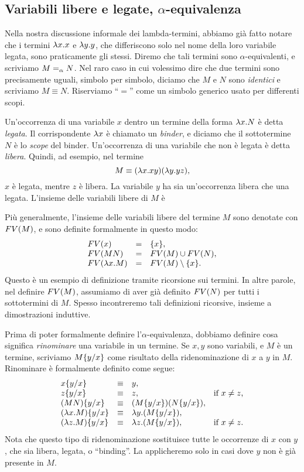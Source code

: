 \documentclass{article}
\begin{document}
\subsection{Variabili libere e legate, $\alpha$-equivalenza}

Nella nostra discussione informale dei lambda-termini, abbiamo gi\`a fatto
notare che i termini $\lambda x.x$ e $\lambda y.y$, che differiscono solo nel
nome della loro variabile legata, sono praticamente gli stessi. Diremo che
tali termini sono $\alpha$-equivalenti, e scriviamo $M=_{\alpha} N$. Nel raro
caso in cui volessimo dire che due termini sono precisamente uguali, simbolo
per simbolo, diciamo che $M$ e $N$ sono {\em identici} e scriviamo $M\equiv N$.
Riserviamo ``$=$'' come un simbolo generico usato per differenti scopi.

Un'occorrenza di una variabile $x$ dentro un termine della forma $\lambda x.N$
\`e detta {\em legata}. Il corrispondente $\lambda x$ \`e chiamato un {\em binder}, e
diciamo che il sottotermine $N$ \`e lo {\em scope} del binder. Un'occorrenza di
una variabile che non \`e legata \`e detta {\em libera}. Quindi,
ad esempio, nel termine
\[   M \equiv (\lambda x.xy)(\lambda y.yz), \]
$x$ \`e legata, mentre $z$ \`e libera. La variabile $y$ ha sia un'occorrenza libera
che una legata. L'insieme delle variabili libere di $M$ \`e

Pi\`u generalmente, l'insieme delle variabili libere del termine $M$ sono
denotate con $FV(M)$, e sono definite formalmente in questo modo:
\[ \begin{array}{lll}
  FV(x) &=& \{x\}, \\
  FV(MN) &=& FV(M)\cup FV(N), \\
  FV(\lambda x.M) &=& FV(M) \setminus \{x\}.
\end{array}
\]
Questo \`e un esempio di definizione tramite ricorsione sui termini. In
altre parole, nel definire $FV(M)$, assumiamo di aver gi\`a definito
$FV(N)$ per tutti i sottotermini di $M$. Spesso incontreremo tali
definizioni ricorsive, insieme a dimostrazioni induttive.

Prima di poter formalmente definire l'$\alpha$-equivalenza, dobbiamo definire
cosa significa {\em rinominare} una variabile in un termine. Se $x,y$ sono
variabili, e $M$ \`e un termine, scriviamo $M\{y/x\}$ come risultato della
ridenominazione di $x$ a $y$ in $M$. Rinominare \`e formalmente definito come segue:
\[ \begin{array}{llll}
  x\{y/x\} &\equiv& y, \\
  z\{y/x\} &\equiv& z, & \mbox{if $x\neq z$,} \\
  (MN)\{y/x\} &\equiv& (M\{y/x\})(N\{y/x\}), \\
  (\lambda x.M)\{y/x\} &\equiv& \lambda y.(M\{y/x\}), \\
  (\lambda z.M)\{y/x\} &\equiv& \lambda z.(M\{y/x\}), & \mbox{if
  $x\neq z$.}
\end{array}
\]
Nota che questo tipo di ridenominazione sostituisce tutte le occorrenze di $x$ con
$y$, che sia libera, legata, o ``binding''. La applicheremo solo in casi dove
$y$ non \`e gi\`a presente in $M$.
\end{document}
